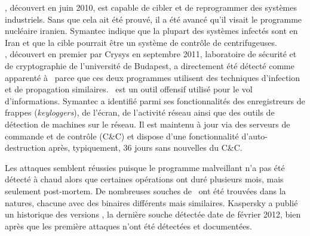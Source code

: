 \stux, découvert en juin 2010, est capable de cibler et de reprogrammer des systèmes industriels.
Sans que cela ait été prouvé, il a été avancé qu'il visait le programme nucléaire iranien. 
Symantec \cite{SymantecStux2011} indique que la plupart des systèmes infectés sont en Iran et que la cible pourrait être un système de contrôle de centrifugeuses.
\\

\duqu, découvert en premier par Crysys \cite{CrysysDuquStuxnet} en septembre 2011, laboratoire de sécurité et de cryptographie de l'université de Budapest, a directement été détecté comme apparenté à \stux\ parce que ces deux programmes utilisent des techniques d'infection et de propagation similaires.
\duqu\ est un outil offensif utilisé pour le vol d'informations. Symantec \cite{SymantecDuqu2011} a identifié parmi ses fonctionnalités des enregistreurs de frappes (\emph{keyloggers}), de l'écran, de l'activité réseau ainsi que des outils de détection de machines sur le réseau.
Il est maintenu à jour via des serveurs de commande et de contrôle (C\&C) et dispose d'une fonctionnalité d'auto-destruction après, typiquement, 36 jours sans nouvelles du C\&C.

Les attaques semblent réussies puisque le programme malveillant n'a pas été détecté à chaud alors que certaines opérations ont duré plusieurs mois, mais seulement post-mortem. De nombreuses souches de \duqu\ ont été trouvées dans la natures, chacune avec des binaires différents mais similaires. Kaspersky a publié un historique des versions \cite{KaspDuqu10}, la dernière souche détectée date de février 2012, bien après que les première attaques n'ont été détectées et documentées.


